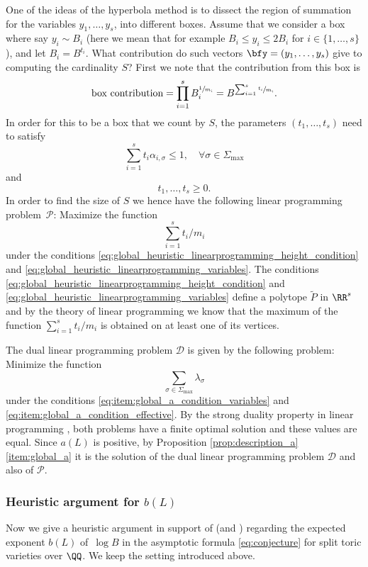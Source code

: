 One of the ideas of the hyperbola method is to dissect the region of summation for the variables $y_1,\dots,y_s$, into different boxes. Assume that we consider a box where say $y_i \sim B_i$ (here we mean that for example $B_i\leq y_i\leq 2B_i$ for $i\in\{1,\dots,s\}$), and let $B_i=B^{t_i}$. What contribution do such vectors $\bfy=(y_1,\dots,y_s)$ give to computing the cardinality $S$? First we note that the contribution from this box is
\[
\text{box contribution} = \prod_{i=1}^sB_i^{\sfrac 1{m_i}}=B^{\sum_{i=1}^s \sfrac{t_i}{m_i} }.
\]
In order for this to be a box that we count by $S$, the parameters $(t_1,\dots,t_s)$ need to satisfy
\begin{equation}
\label{eq:global_heuristic_linearprogramming_height_condition}
\sum_{i=1}^s t_i \alpha_{i,\sigma}\leq 1, \quad \forall \sigma\in\Sigma_{\max}
\end{equation}
and
\begin{equation}
\label{eq:global_heuristic_linearprogramming_variables}
t_1,\dots,t_s\geq0.
\end{equation}
In order to find the size of $S$ we hence have the following linear programming problem~$\mathcal{P}$:
Maximize the function
\begin{equation}
\label{eq:maximize_global_function}
\sum_{i=1}^s t_i/m_i
\end{equation}
under the conditions \eqref{eq:global_heuristic_linearprogramming_height_condition} and \eqref{eq:global_heuristic_linearprogramming_variables}.
The conditions \eqref{eq:global_heuristic_linearprogramming_height_condition} and \eqref{eq:global_heuristic_linearprogramming_variables} define a polytope $\widetilde P$ in $\RR^s$ and by the theory of linear programming we know that the maximum of the function $\sum_{i=1}^s t_i/m_i$ is obtained on at least one of its vertices.

The dual linear programming problem $\mathcal{D}$ is given by the following problem:
Minimize the function
\[
\sum_{\sigma\in\Sigma_{\max}}\lambda_\sigma
\]
under the conditions \eqref{eq:item:global_a_condition_variables} and \eqref{eq:item:global_a_condition_effective}.
By the strong duality property in linear programming \cite[Ch.\,6]{Dantzig}, both problems have a finite optimal solution and these values are equal. Since $a(L)$ is positive, by Proposition \ref{prop:description_a}\eqref{item:global_a} it is the solution of the dual linear programming problem $\mathcal{D}$ and also of $\mathcal{P}$.

\subsubsection{Heuristic argument for $b(L)$}
Now we give a heuristic argument in support of \cite[Conj.\,1.1]{PSTVA}
(and \cite[\S3.3]{MR1032922})
regarding the expected exponent $b(L)$ of~$\log B$ in the asymptotic
formula \eqref{eq:conjecture} for split toric varieties over $\QQ$.
We keep the setting introduced above.

